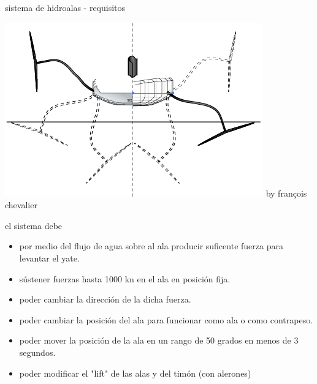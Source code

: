 \documentclass[presentation,aspectratio=169]{beamer}
\begin{document}
\begin{frame}[label={sec:orge217b70}]{sistema de hidroalas - requisitos}
\begin{center}
\includegraphics[height=0.2\textheight]{../../figures/ac75-sketch.png}
{\footnotesize  by françois chevalier}
\end{center}

el sistema debe
\begin{itemize}
\item por medio del flujo de agua sobre al ala producir suficente fuerza para levantar el yate.
\item sústener fuerzas hasta 1000 kn en el ala en posición fija.
\item poder cambiar la dirección de la dicha fuerza.
\item poder cambiar la posición del ala para funcionar como ala o como contrapeso.
\item poder mover la posición de la ala en un rango de 50 grados en menos de 3 segundos.
\item poder modificar el "lift" de las alas y del timón (con alerones)
\end{itemize}
\end{frame}
\end{document}
